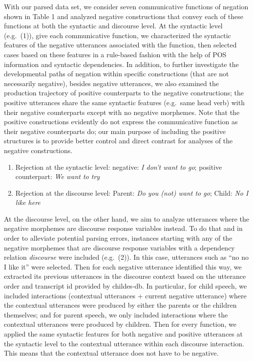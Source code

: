 \documentclass[
  english,
  man,floatsintext]{apa6}
\providecommand{\tightlist}{%
  \setlength{\itemsep}{0pt}\setlength{\parskip}{0pt}}
\begin{document}
With our parsed data set, we consider seven communicative functions of negation shown in Table 1 and analyzed negative constructions that convey each of these functions at both the syntactic and discourse level. At the syntactic level (e.g.~(1)), give each communicative function, we characterized the syntactic features of the negative utterances associated with the function, then selected cases based on these features in a rule-based fashion with the help of POS information and syntactic dependencies. In addition, to further investigate the developmental paths of negation within specific constructions (that are not necessarily negative), besides negative utterances, we also examined the production trajectory of positive counterparts to the negative constructions; the positive utterances share the same syntactic features (e.g.~same head verb) with their negative counterparts except with no negative morphemes. Note that the positive constructions evidently do not express the communicative function as their negative counterparts do; our main purpose of including the positive structures is to provide better control and direct contrast for analyses of the negative constructions.

\begin{enumerate}
\def\labelenumi{(\arabic{enumi})}
\tightlist
\item
  Rejection at the syntactic level:
  negative: \emph{I don't want to go}; positive counterpart: \emph{We want to try}
\item
  Rejection at the discourse level:
  Parent: \emph{Do you (not) want to go}; Child: \emph{No I like here}
\end{enumerate}

At the discourse level, on the other hand, we aim to analyze utterances where the negative morphemes are discourse response variables instead. To do that and in order to alleviate potential parsing errors, instances starting with any of the negative morphemes that are discourse response variables with a dependency relation \emph{discourse} were included (e.g.~(2)). In this case, utterances such as ``no no I like it'' were selected. Then for each negative utterance identified this way, we extracted its previous utterances in the discourse context based on the utterance order and transcript id provided by childes-db. In particular, for child speech, we included interactions (contextual utterances + current negative utterance) where the contextual utterances were produced by either the parents or the children themselves; and for parent speech, we only included interactions where the contextual utterances were produced by children. Then for every function, we applied the same syntactic features for both negative and positive utterances at the syntactic level to the contextual utterance within each discourse interaction. This means that the contextual utterance does not have to be negative.
\end{document}
